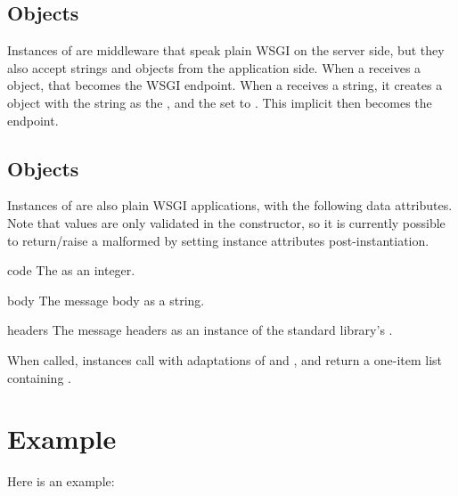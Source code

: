\documentclass{manual}
\begin{document}
\section{ Objects \label{responder}}

Instances of  are middleware that speak plain WSGI on the
server side, but they also accept strings and  objects from the
application side. When a  receives a  object,
that becomes the WSGI endpoint. When a  receives a string, it
creates a  object with the string as the , and the
 set to . This implicit
 then becomes the endpoint.


\section{ Objects \label{response}}

Instances of  are also plain WSGI applications, with the
following data attributes. Note that values are only validated in the
constructor, so it is currently possible to return/raise a malformed
 by setting instance attributes post-instantiation.

\begin{datadesc}{code}
The  as an integer.
\end{datadesc}

\begin{datadesc}{body}
The message body as a string.
\end{datadesc}

\begin{datadesc}{headers}
The message headers as an instance of the standard library's
.
\end{datadesc}

When called,  instances call  with
adaptations of  and , and return a one-item list
containing .


\chapter{Example \label{example}}

Here is an example:
\end{document}
